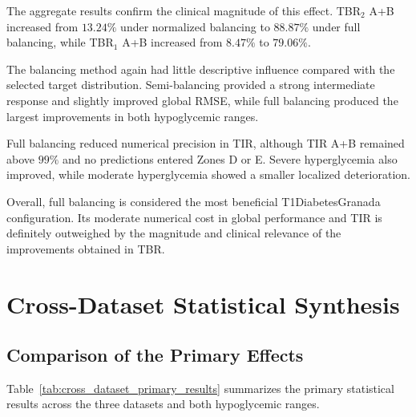 The aggregate results confirm the clinical magnitude of this effect. TBR$_2$ A+B increased from \(13.24\%\) under normalized balancing to \(88.87\%\) under full balancing, while TBR$_1$ A+B increased from \(8.47\%\) to \(79.06\%\).

The balancing method again had little descriptive influence compared with the selected target distribution. Semi-balancing provided a strong intermediate response and slightly improved global RMSE, while full balancing produced the largest improvements in both hypoglycemic ranges.

Full balancing reduced numerical precision in TIR, although TIR A+B remained above \(99\%\) and no predictions entered Zones D or E. Severe hyperglycemia also improved, while moderate hyperglycemia showed a smaller localized deterioration.

Overall, full balancing is considered the most beneficial T1DiabetesGranada configuration. Its moderate numerical cost in global performance and TIR is definitely outweighed by the magnitude and clinical relevance of the improvements obtained in TBR.



\section{Cross-Dataset Statistical Synthesis}
\label{sec:cross_dataset_statistical_synthesis}

\subsection{Comparison of the Primary Effects}
\label{subsec:primary_effect_comparison}

Table~\ref{tab:cross_dataset_primary_results} summarizes the primary statistical results across the three datasets and both hypoglycemic ranges.

